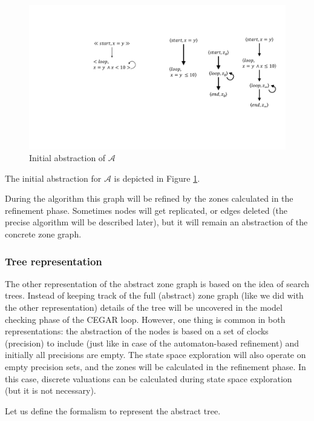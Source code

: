 \begin{runningExample}
\begin{figure}
	\centering
	\includegraphics[width=.2\textwidth]{include/figures/graph_init}
	\caption{Initial abstraction of $\mathcal{A}$}
	\label{fig:graphinit}
\end{figure}

\begin{runningExample}
	The initial abstraction for $\mathcal{A}$ is depicted in Figure \ref{fig:graphinit}.
\end{runningExample}

During the algorithm this graph will be refined by the zones calculated in the refinement phase. Sometimes nodes will get replicated, or edges deleted (the precise algorithm will be described later), but it will remain  an abstraction of the concrete zone graph. 



 

\subsubsection{Tree representation}
The other representation of the abstract zone graph is based on the idea of search trees. Instead of keeping track of the full (abstract) zone graph (like we did with the other representation) details of the tree will be uncovered in the model checking phase of the CEGAR loop. However, one thing is common in both representations:  the abstraction of the nodes is based on a set of clocks (precision) to include (just like in case of the automaton-based refinement) and initially all precisions are empty. The state space exploration will also operate on empty precision sets, and the zones will be calculated in the refinement phase. In this case, discrete valuations can be calculated during state space exploration (but it is not necessary).

Let us define the formalism to represent the abstract tree.


\end{runningExample}

